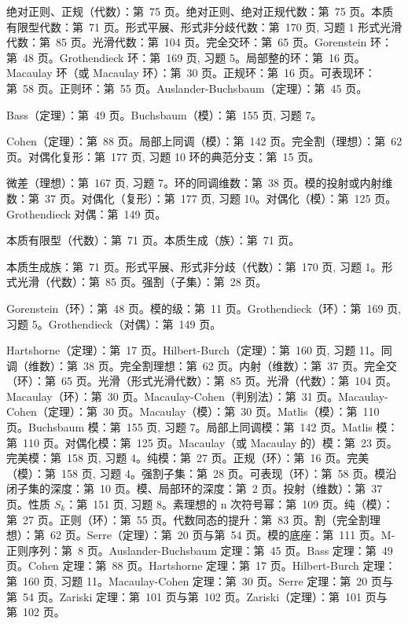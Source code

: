 
绝对正则、正规（代数）：第~75 页。绝对正则、绝对正规代数：第~75 页。本质有限型代数：第~71 页。形式平展、形式非分歧代数：第~170 页, 习题 1 形式光滑代数：第~85 页。光滑代数：第~104 页。完全交环：第~65 页。Gorenstein 环：第~48 页。Grothendieck 环：第~169 页, 习题 5。局部整的环：第~16 页。Macaulay 环（或 Macaulay 环）：第~30 页。正规环：第~16 页。可表现环：第~58 页。正则环：第~55 页。Auslander-Buchsbaum（定理）：第~45 页。

Bass（定理）：第~49 页。Buchsbaum（模）：第~155 页, 习题 7。

Cohen（定理）：第~88 页。局部上同调（模）：第~142 页。完全割（理想）：第~62 页。对偶化复形：第~177 页, 习题 10 环的典范分支：第~15 页。

微差（理想）：第~167 页, 习题 7。环的同调维数：第~38 页。模的投射或内射维数：第~37 页。对偶化（复形）：第~177 页, 习题 10。对偶化（模）：第~125 页。Grothendieck 对偶：第~149 页。

本质有限型（代数）：第~71 页。本质生成（族）：第~71 页。

本质生成族：第~71 页。形式平展、形式非分歧（代数）：第~170 页, 习题 1。形式光滑（代数）：第~85 页。强割（子集）：第~28 页。

Gorenstein（环）：第~48 页。模的级：第~11 页。Grothendieck（环）：第~169 页, 习题 5。Grothendieck（对偶）：第~149 页。

Hartshorne（定理）：第~17 页。Hilbert-Burch（定理）：第~160 页, 习题 11。同调（维数）：第~38 页。完全割理想：第~62 页。内射（维数）：第~37 页。完全交（环）：第~65 页。光滑（形式光滑代数）：第~85 页。光滑（代数）：第~104 页。Macaulay（环）：第~30 页。Macaulay-Cohen（判别法）：第~31 页。Macaulay-Cohen（定理）：第~30 页。Macaulay（模）：第~30 页。Matlis（模）：第~110 页。Buchsbaum 模：第~155 页, 习题 7。局部上同调模：第~142 页。Matlis 模：第~110 页。对偶化模：第~125 页。Macaulay（或 Macaulay 的）模：第~23 页。完美模：第~158 页, 习题 4。纯模：第~27 页。正规（环）：第~16 页。完美（模）：第~158 页, 习题 4。强割子集：第~28 页。可表现（环）：第~58 页。模沿闭子集的深度：第~10 页。模、局部环的深度：第~2 页。投射（维数）：第~37 页。性质 \(S_k\)：第~151 页, 习题 8。素理想的 n 次符号幂：第~109 页。纯（模）：第~27 页。正则（环）：第~55 页。代数同态的提升：第~83 页。割（完全割理想）：第~62 页。Serre（定理）：第~20 页与第~54 页。模的底座：第~111 页。M-正则序列：第~8 页。Auslander-Buchsbaum 定理：第~45 页。Bass 定理：第~49 页。Cohen 定理：第~88 页。Hartshorne 定理：第~17 页。Hilbert-Burch 定理：第~160 页, 习题 11。Macaulay-Cohen 定理：第~30 页。Serre 定理：第~20 页与第~54 页。Zariski 定理：第~101 页与第~102 页。Zariski（定理）：第~101 页与第~102 页。
